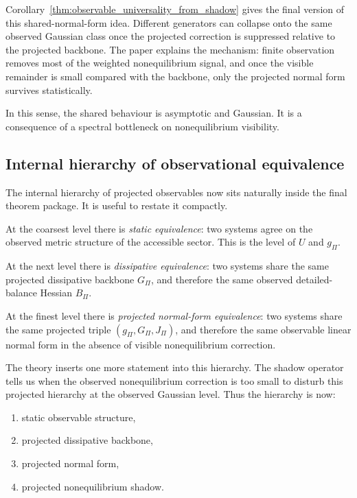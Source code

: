 \documentclass[11pt,a4paper]{article}
\numberwithin{equation}{section}
\theoremstyle{thmcompact}
\theoremstyle{remark}
\begin{document}
Corollary~\ref{thm:observable_universality_from_shadow} gives the final version of this shared-normal-form idea. Different generators can collapse onto the same observed Gaussian class once the projected correction is suppressed relative to the projected backbone. The paper explains the mechanism: finite observation removes most of the weighted nonequilibrium signal, and once the visible remainder is small compared with the backbone, only the projected normal form survives statistically.

In this sense, the shared behaviour is asymptotic and Gaussian. It is a consequence of a spectral bottleneck on nonequilibrium visibility.

\subsection{Internal hierarchy of observational equivalence}

The internal hierarchy of projected observables now sits naturally inside the final theorem package. It is useful to restate it compactly.

At the coarsest level there is \emph{static equivalence}: two systems agree on the observed metric structure of the accessible sector. This is the level of \(U\) and \(g_\Pi\).

At the next level there is \emph{dissipative equivalence}: two systems share the same projected dissipative backbone \(G_\Pi\), and therefore the same observed detailed-balance Hessian \(B_\Pi\).

At the finest level there is \emph{projected normal-form equivalence}: two systems share the same projected triple \((g_\Pi,G_\Pi,J_\Pi)\), and therefore the same observable linear normal form in the absence of visible nonequilibrium correction.

The theory inserts one more statement into this hierarchy. The shadow operator tells us when the observed nonequilibrium correction is too small to disturb this projected hierarchy at the observed Gaussian level. Thus the hierarchy is now:

\begin{enumerate}
\item static observable structure,
\item projected dissipative backbone,
\item projected normal form,
\item projected nonequilibrium shadow.
\end{enumerate}
\end{document}
